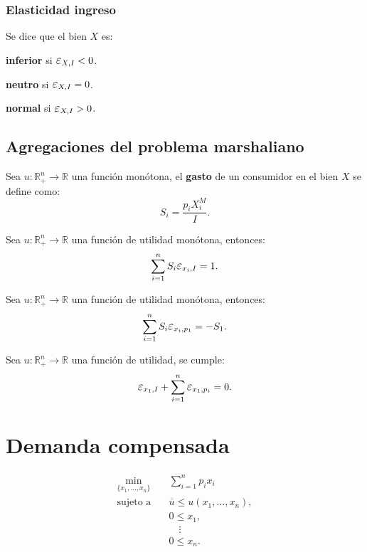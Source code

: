 \documentclass[8pt,a4paper]{extarticle}
\begin{document}
\begin{multicols}{3}
\subsubsection*{Elasticidad ingreso}

Se dice que el bien $X$ es:

\begin{eqlist}
\item \textbf{inferior} si $\E_{X, I} < 0$.
\item \textbf{neutro} si $\E_{X, I} = 0$.
\item \textbf{normal} si $\E_{X, I} > 0$.
\end{eqlist}

\subsection{Agregaciones del problema marshaliano}

\begin{boxdef}
	Sea $u : \mathbb{R}^n_+ \to \mathbb{R}$ una función monótona, el \textbf{gasto} de un consumidor en el bien $X$ se define como:
	\[
	S_i = \frac{p_i X_i^M}{I}
	.\] 
\end{boxdef}

\begin{boxtheo}
	Sea $u : \mathbb{R}^n_+ \to \mathbb{R}$ una función de utilidad monótona, entonces:
	\[
		\sum_{i = 1}^{n} S_{{i}} \E_{x_i, I} = 1
	.\] 
\end{boxtheo}

\begin{boxtheo}
	Sea $u : \mathbb{R}^n_+ \to \mathbb{R}$ una función de utilidad monótona, entonces:
	\[
		\sum_{i = 1}^{n} S_{i} \E_{x_i, p_{1}} = - S_{1}
	.\] 
\end{boxtheo}

\begin{boxtheo}
	Sea $u : \mathbb{R}^n_+ \to \mathbb{R}$ una función de utilidad, se cumple:
	\[
		\E_{x_1, I} + \sum_{i=1}^{n} \E_{x_1, p_{i}} = 0
	.\] 
\end{boxtheo}

\newpage

\section{Demanda compensada}

\begin{equation*}
\begin{aligned}
	\min_{\{x_1, \ldots, x_n\}}\	  & \sum_{i=1}^{n} p_i x_i \\
	\text{sujeto a} \quad & \bar{u} \le u(x_1, \ldots, x_n), \\
						  & 0 \le x_1, \\
						  & \quad \vdots \\
						  & 0 \le x_n.
\end{aligned}
\end{equation*}


\end{multicols}
\end{document}
